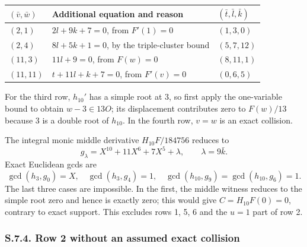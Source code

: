 \documentclass[
  british,
  10pt,
]{article}
\newcounter{none} %
\begin{document}
{\def\LTcaptype{none} %
\begin{longtable}[]{@{}
  >{\raggedright\arraybackslash}p{}
  >{\raggedright\arraybackslash}p{}
  >{\raggedright\arraybackslash}p{}@{}}
\toprule\noalign{}
\begin{minipage}[b]{\linewidth}\raggedright
\((\bar v,\bar w)\)
\end{minipage} & \begin{minipage}[b]{\linewidth}\raggedright
Additional equation and reason
\end{minipage} & \begin{minipage}[b]{\linewidth}\raggedright
\((\bar t,\bar l,\bar k)\)
\end{minipage} \\
\midrule\noalign{}
\endhead
\bottomrule\noalign{}
\endlastfoot
\((2,1)\) & \(2l+9k+7=0\), from \(F'(1)=0\) & \((1,3,0)\) \\
\((2,4)\) & \(8l+5k+1=0\), by the triple-cluster bound & \((5,7,12)\) \\
\((11,3)\) & \(11l+9=0\), from \(F(w)=0\) & \((8,11,1)\) \\
\((11,11)\) & \(t+11l+k+7=0\), from \(F'(v)=0\) & \((0,6,5)\) \\
\end{longtable}
}

For the third row, \(h_{10}'\) has a simple root at 3, so first apply
the one-variable bound to obtain \(w-3\in13O\); its displacement
contributes zero to \(F(w)/13\) because 3 is a double root of
\(h_{10}\). In the fourth row, \(v=w\) is an exact collision.

The integral monic middle derivative \(H_{10}F/184756\) reduces to \[
g_\lambda=X^{10}+11X^6+7X^5+\lambda,\qquad \lambda=9\bar k.
\] Exact Euclidean gcds are \[
\gcd(h_3,g_0)=X,\quad\gcd(h_3,g_4)=1,\quad
\gcd(h_{10},g_9)=\gcd(h_{10},g_6)=1.
\tag{S20}
\] The last three cases are impossible. In the first, the middle witness
reduces to the simple root zero and hence is exactly zero; this would
give \(C=H_{10}F(0)=0\), contrary to exact support. This excludes rows
1, 5, 6 and the \(u=1\) part of row 2.

\subsubsection{S.7.4. Row 2 without an assumed exact
collision}\label{s.7.4.-row-2-without-an-assumed-exact-collision}
\end{document}
